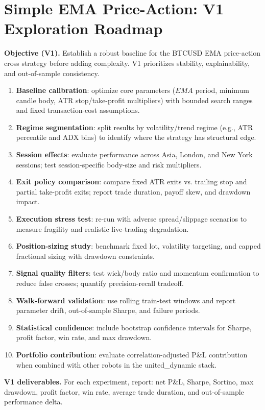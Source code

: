 \section{Simple EMA Price-Action: V1 Exploration Roadmap}
\label{sec:simple-ema-v1-roadmap}

\textbf{Objective (V1).}
Establish a robust baseline for the BTCUSD EMA price-action cross strategy before adding complexity. V1 prioritizes stability, explainability, and out-of-sample consistency.

\begin{enumerate}
  \item \textbf{Baseline calibration}: optimize core parameters ($EMA$ period, minimum candle body, ATR stop/take-profit multipliers) with bounded search ranges and fixed transaction-cost assumptions.
  \item \textbf{Regime segmentation}: split results by volatility/trend regime (e.g., ATR percentile and ADX bins) to identify where the strategy has structural edge.
  \item \textbf{Session effects}: evaluate performance across Asia, London, and New York sessions; test session-specific body-size and risk multipliers.
  \item \textbf{Exit policy comparison}: compare fixed ATR exits vs. trailing stop and partial take-profit exits; report trade duration, payoff skew, and drawdown impact.
  \item \textbf{Execution stress test}: re-run with adverse spread/slippage scenarios to measure fragility and realistic live-trading degradation.
  \item \textbf{Position-sizing study}: benchmark fixed lot, volatility targeting, and capped fractional sizing with drawdown constraints.
  \item \textbf{Signal quality filters}: test wick/body ratio and momentum confirmation to reduce false crosses; quantify precision-recall tradeoff.
  \item \textbf{Walk-forward validation}: use rolling train-test windows and report parameter drift, out-of-sample Sharpe, and failure periods.
  \item \textbf{Statistical confidence}: include bootstrap confidence intervals for Sharpe, profit factor, win rate, and max drawdown.
  \item \textbf{Portfolio contribution}: evaluate correlation-adjusted P\&L contribution when combined with other robots in the united\_dynamic stack.
\end{enumerate}

\textbf{V1 deliverables.}
For each experiment, report: net P\&L, Sharpe, Sortino, max drawdown, profit factor, win rate, average trade duration, and out-of-sample performance delta.

